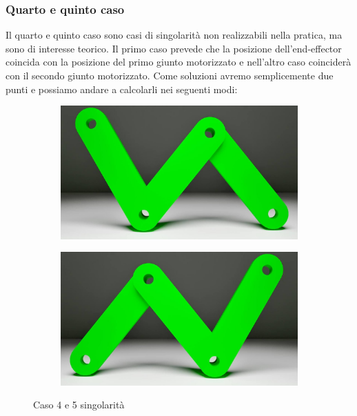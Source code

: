 \subsubsection*{Quarto e quinto caso}
Il quarto e quinto caso sono casi di singolarità non realizzabili nella pratica, ma sono di interesse teorico. Il primo caso prevede che la posizione dell'end-effector coincida con la posizione del primo giunto motorizzato e nell'altro caso coinciderà con il secondo giunto motorizzato. Come soluzioni avremo semplicemente due punti e possiamo andare a calcolarli nei seguenti modi:
\begin{figure}[!ht]
	\begin{subfigure}{.5\textwidth}
		\centering
		\includegraphics[width=.9\linewidth]{Immagini/Singolarity/3}
		\label{fig:sing4}
	\end{subfigure}
	\begin{subfigure}{.5\textwidth}
		\centering
		\includegraphics[width=.9\linewidth]{Immagini/Singolarity/4}  
		\label{fig:sing5}
	\end{subfigure}
	\caption{Caso 4 e 5 singolarità}
	\label{Caso4Sing}
\end{figure}

